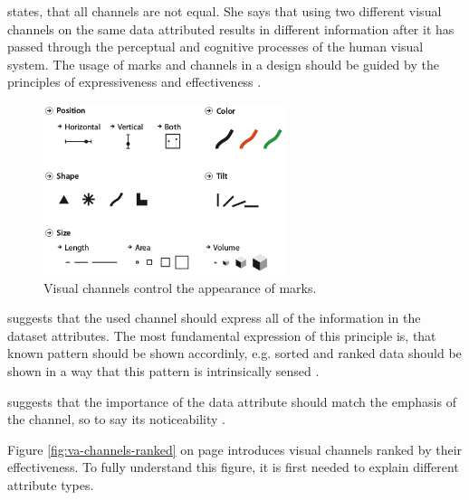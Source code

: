 \citeauthor{Munzner2014} states, that all channels are not equal. She says that using two different visual channels on the same data attributed results in different information after it has passed through the perceptual and cognitive processes of the human visual system. The usage of marks and channels in a design should be guided by the principles of expressiveness and effectiveness .

\begin{figure}[!htb]
\centering
\includegraphics[height=5cm,keepaspectratio]{images/va/channels.png}
\caption[
    Visual channels control the appearance of marks .
]{Visual channels control the appearance of marks.}
\label{fig:va-channels}
\end{figure}

\begin{enumerate}
 suggests that the used channel should express all of the information in the dataset attributes. The most fundamental expression of this principle is, that known pattern should be shown accordinly, e.g. sorted and ranked data should be shown in a way that this pattern is intrinsically sensed .

 suggests that the importance of the data attribute should match the emphasis of the channel, so to say its noticeability .
\end{enumerate}

Figure \ref{fig:va-channels-ranked} on page \pageref{fig:va-channels-ranked} introduces visual channels ranked by their effectiveness. To fully understand this figure, it is first needed to explain different attribute types.

